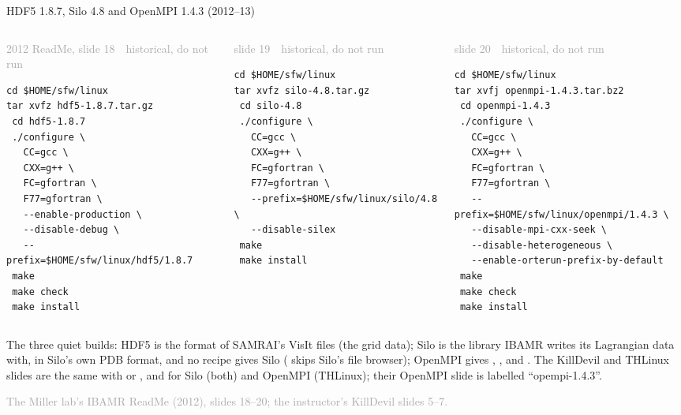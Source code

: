 \documentclass[aspectratio=169,11pt]{beamer}
\newcommand{\sourcecredit}[1]{\vfill\begin{flushright}\tiny\textcolor{DarkGray}{#1}\end{flushright}}
\newcommand{\hist}[1]{{\tiny\sffamily\textcolor{DarkGray}{#1\ \textbullet\ historical, do not run}}\par\nointerlineskip\vspace{0.3mm}}
\begin{document}
\begin{frame}[fragile]{HDF5 1.8.7, Silo 4.8 and OpenMPI 1.4.3 (2012--13)}
\label{fr:hdf5}
\begin{columns}[T,onlytextwidth]
\begin{column}{0.32\textwidth}
\hist{2012 ReadMe, slide 18}
\begin{lstlisting}[style=hist]
cd $HOME/sfw/linux
tar xvfz hdf5-1.8.7.tar.gz
 cd hdf5-1.8.7
 ./configure \
   CC=gcc \
   CXX=g++ \
   FC=gfortran \
   F77=gfortran \
   --enable-production \
   --disable-debug \
   --prefix=$HOME/sfw/linux/hdf5/1.8.7
 make
 make check
 make install
\end{lstlisting}
\end{column}
\begin{column}{0.3\textwidth}
\hist{slide 19}
\begin{lstlisting}[style=hist]
cd $HOME/sfw/linux
tar xvfz silo-4.8.tar.gz
 cd silo-4.8
 ./configure \
   CC=gcc \
   CXX=g++ \
   FC=gfortran \
   F77=gfortran \
   --prefix=$HOME/sfw/linux/silo/4.8 \
   --disable-silex
 make
 make install
\end{lstlisting}
\end{column}
\begin{column}{0.35\textwidth}
\hist{slide 20}
\begin{lstlisting}[style=hist]
cd $HOME/sfw/linux
tar xvfj openmpi-1.4.3.tar.bz2
 cd openmpi-1.4.3
 ./configure \
   CC=gcc \
   CXX=g++ \
   FC=gfortran \
   F77=gfortran \
   --prefix=$HOME/sfw/linux/openmpi/1.4.3 \
   --disable-mpi-cxx-seek \
   --disable-heterogeneous \
   --enable-orterun-prefix-by-default
 make
 make check
 make install
\end{lstlisting}
\end{column}
\end{columns}
\vspace{1mm}
\footnotesize The three quiet builds: HDF5 is the format of SAMRAI's VisIt files (the grid data); Silo is the library IBAMR writes its Lagrangian data with, in Silo's own PDB format, and no recipe gives Silo  ( skips Silo's file browser); OpenMPI gives , ,  and . The KillDevil and THLinux slides are the same with  or , and  for Silo (both) and OpenMPI (THLinux); their OpenMPI slide is labelled ``opempi-1.4.3''.
\sourcecredit{The Miller lab's IBAMR ReadMe (2012), slides 18--20; the instructor's KillDevil slides 5--7.}
\end{frame}
\end{document}
